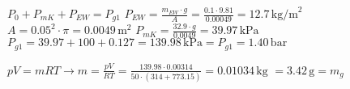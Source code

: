 \( P_0 + P_{mK} + P_{EW} = P_{g1} \)  
\( P_{EW} = \frac{m_{EW} \cdot g}{A} = \frac{0.1 \cdot 9.81}{0.00049} = 12.7 \, \text{kg/m}^2 \)  
\( A = 0.05^2 \cdot \pi = 0.0049 \, \text{m}^2 \)  
\( P_{mK} = \frac{32.9 \cdot g}{0.0049} = 39.97 \, \text{kPa} \)  
\( P_{g1} = 39.97 + 100 + 0.127 = 139.98 \, \text{kPa} = P_{g1} = 1.40 \, \text{bar} \)  

\( pV = mRT \rightarrow m = \frac{pV}{RT} = \frac{139.98 \cdot 0.00314}{50 \cdot (314 + 773.15)} = 0.01034 \, \text{kg} \)  
\( = 3.42 \, \text{g} = m_g \)